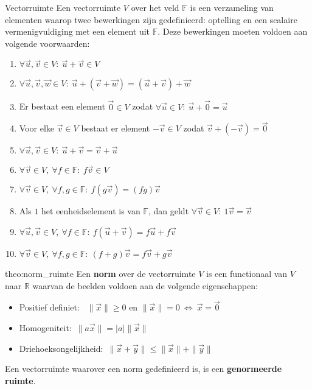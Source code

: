 \vspace{0.5cm}

\begin{theo}[Vectorruimte]{Vectorruimte}
    Een vectorruimte $V$ over het veld $\mathbb{F}$ is een verzameling van elementen waarop twee bewerkingen zijn gedefinieerd: optelling en een scalaire vermenigvuldiging met een element uit $\mathbb{F}$. Deze bewerkingen moeten voldoen aan volgende voorwaarden:
    \begin{enumerate}
        \item $\forall \vec{u},\vec{v} \in V: \ \vec{u} + \vec{v} \in V$
        \item $\forall \vec{u},\vec{v},\vec{w} \in V: \ \vec{u} + (\vec{v} + \vec{w}) = (\vec{u} + \vec{v}) + \vec{w}$
        \item Er bestaat een element $\vec{0} \in V$ zodat $\forall \vec{u} \in V: \ \vec{u} + \vec{0} = \vec{u}$
        \item Voor elke $\vec{v} \in V$ bestaat er element $-\vec{v} \in V$ zodat $\vec{v} + (-\vec{v}) = \vec{0}$
        \item $\forall \vec{u},\vec{v} \in V: \ \vec{u} + \vec{v} = \vec{v} + \vec{u}$
        \item $\forall \vec{v} \in V,\ \forall f \in \mathbb{F}: \ f \vec{v} \in V$
        \item $\forall \vec{v} \in V,\ \forall f,g \in \mathbb{F}: \ f(g\vec{v}) = (fg)\vec{v}$
        \item Als $1$ het eenheidselement is van $\mathbb{F}$, dan geldt $\forall \vec{v} \in V: \ 1\vec{v} = \vec{v}$
        \item $\forall \vec{u},\vec{v} \in V,\ \forall f \in \mathbb{F}: \ f(\vec{u} + \vec{v}) = f\vec{u} + f\vec{v}$
        \item $\forall \vec{v} \in V,\ \forall f,g \in \mathbb{F}: \ (f+g)\vec{v} = f\vec{v} + g\vec{v}$
    \end{enumerate}
\end{theo}

\begin{theo}{theo:norm_ruimte}
    Een \textbf{norm} over de vectorruimte $V$ is een functionaal van $V$ naar $\mathbb{R}$ waarvan de beelden voldoen aan de volgende eigenschappen:
    \begin{itemize}
        \item Positief definiet: \ $\|\vec{x}\| \geq 0$ en $\|\vec{x}\| = 0 \ \Leftrightarrow \ \vec{x} = \vec{0}$
        \item Homogeniteit:\ $\|a\vec{x}\| = |a|\|\vec{x}\|$
        \item Driehoeksongelijkheid:\ $\|\vec{x} + \vec{y}\| \leq \|\vec{x}\| + \|\vec{y}\|$
    \end{itemize}
    Een vectorruimte waarover een norm gedefinieerd is, is een \textbf{genormeerde ruimte}.
\end{theo}

